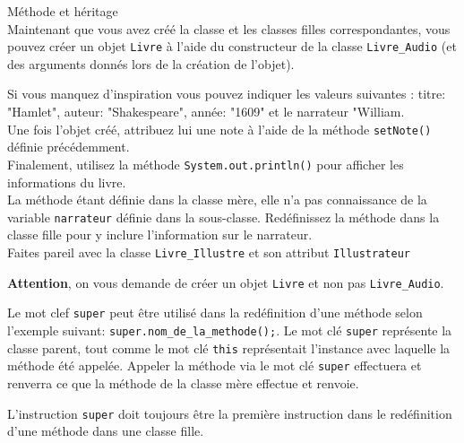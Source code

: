 \begin{Exercice}[5 minutes] Méthode et héritage \\

Maintenant que vous avez créé la classe et les classes filles correspondantes, vous pouvez créer un objet \lstinline{Livre} à l'aide du constructeur de la classe \lstinline{Livre_Audio} (et des arguments donnés lors de la création de l'objet).


Si vous manquez d'inspiration vous pouvez indiquer les valeurs suivantes : titre: "Hamlet", auteur: "Shakespeare", année: "1609" et le narrateur "William.\\

Une fois l'objet créé, attribuez lui une note à l'aide de la méthode \lstinline{setNote()} définie précédemment.\\ 

Finalement, utilisez la méthode \lstinline{System.out.println()} pour afficher les informations du livre.\\

La méthode étant définie dans la classe mère, elle n'a pas connaissance de la variable \lstinline{narrateur} définie dans la sous-classe. Redéfinissez la méthode dans la classe fille pour y inclure l'information sur le narrateur. \\

Faites pareil avec la classe \lstinline{Livre_Illustre} et son attribut \lstinline{Illustrateur}

\begin{conseil}
\textbf{Attention}, on vous demande de créer un objet \lstinline{Livre} et non pas \lstinline{Livre_Audio}.

Le mot clef \lstinline{super} peut être utilisé dans la redéfinition d'une méthode selon l'exemple suivant: \lstinline{super.nom_de_la_methode();}. Le mot clé \lstinline{super} représente la classe parent, tout comme le mot clé \lstinline{this} représentait l'instance avec laquelle la méthode été appelée. Appeler la méthode via le mot clé \lstinline{super} effectuera et renverra ce que la méthode de la classe mère effectue et renvoie.


L'instruction \lstinline{super} doit toujours être la première instruction dans le redéfinition d'une méthode dans une classe fille. 
\end{conseil}

\begin{solution}
	
	
\end{solution}

\end{Exercice}

